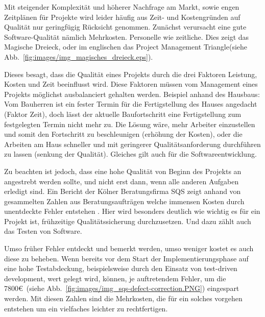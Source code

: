 \documentclass[12pt,a4paper,bibliography=totocnumbered,listof=totocnumbered]{scrartcl}
\begin{document}
Mit steigender Komplexität und höherer Nachfrage am Markt, sowie engen Zeitplänen für Projekte wird leider häufig aus Zeit- und Kostengründen auf Qualität nur geringfügig Rücksicht genommen. Zunächst verursacht eine gute Software-Qualität nämlich Mehrkosten. Personelle wie zeitliche. Dies zeigt das Magische Dreieck, oder im englischen das Project Management Triangle(siehe Abb.~\ref{fig:images/img_magisches_dreieck.eps}).


Dieses besagt, dass die Qualität eines Projekts durch die drei Faktoren Leistung, Kosten und Zeit beeinflusst wird. Diese Faktoren müssen vom Management eines Projekts möglichst ausbalanciert gehalten werden. Beispiel anhand des Hausbaus: Vom Bauherren ist ein fester Termin für die Fertigstellung des Hauses angedacht (Faktor Zeit), doch lässt der aktuelle Baufortschritt eine Fertigstellung zum festgelegten Termin nicht mehr zu. Die Lösung wäre, mehr Arbeiter einzustellen und somit den Fortschritt zu beschleunigen (erhöhung der Kosten), oder die Arbeiten am Haus schneller und mit geringerer Qualitätsanforderung durchführen zu lassen (senkung der Qualität). Gleiches gilt auch für die Softwareentwicklung.

Zu beachten ist jedoch, dass eine hohe Qualität von Beginn des Projekts an angestrebt werden sollte, und nicht erst dann, wenn alle anderen Aufgaben erledigt sind. Ein Bericht der Kölner Beratungsfirma SQS zeigt anhand von gesammelten Zahlen aus Beratungsaufträgen welche immensen Kosten durch unentdeckte Fehler entstehen \cite{sqsdefect}. Hier wird besonders deutlich wie wichtig es für ein Projekt ist, frühzeitige Qua\-li\-täts\-si\-che\-rung durchzusetzen. Und dazu zählt auch das Testen von Software.


Umso früher Fehler entdeckt und bemerkt werden, umso weniger kostet es auch diese zu beheben. Wenn bereits vor dem Start der Implementierungsphase auf eine hohe Testabdeckung, beispielsweise durch den Einsatz von test-driven development, wert gelegt wird, können, je auftretendem Fehler, um die 7800\euro\ (siehe Abb.~\ref{fig:images/img_sqs-defect-correction.PNG}) eingespart werden. Mit diesen Zahlen sind die Mehrkosten, die für ein solches vorgehen entstehen um ein vielfaches leichter zu rechtfertigen.
\end{document}
